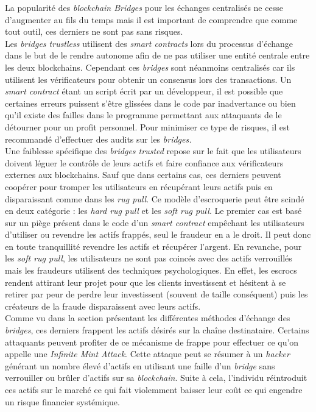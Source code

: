 La popularité des \textit{\gls{blockchain} Bridges} pour les échanges centralisés ne cesse d’augmenter au fils du temps mais il est important de comprendre que comme tout outil, ces derniers ne sont pas sans risques. \\

Les \textit{bridges trustless} utilisent des \textit{\gls{smart contract}s} lors du processus d’échange dans le but de le rendre autonome afin de ne pas utiliser une entité centrale entre les deux \gls{blockchain}s. Cependant ces \textit{bridges} sont néanmoins centralisés car ils utilisent les vérificateurs pour obtenir un consensus lors des transactions.
Un \textit{\gls{smart contract}} étant un script écrit par un développeur, il est possible que certaines erreurs puissent s’être glissées dans le code par inadvertance ou bien qu’il existe des failles dans le programme permettant aux attaquants de le détourner pour un profit personnel. 
Pour minimiser ce type de risques, il est recommandé d’effectuer des audits sur les \textit{bridges.} \\

Une faiblesse spécifique des \textit{bridges trusted} repose sur le fait que les utilisateurs doivent léguer le contrôle de leurs \gls{actif}s et faire confiance aux vérificateurs externes aux \gls{blockchain}s. Sauf que dans certains cas, ces derniers peuvent coopérer pour tromper les utilisateurs en récupérant leurs \gls{actif}s puis en disparaissant comme dans les \textit{rug pull}\cite{EthereumRisks}. Ce modèle d’escroquerie peut être scindé en deux catégorie : les \textit{hard rug pull} et les \textit{soft rug pull}\cite{Hacken}. Le premier cas est basé sur un piège présent dans le code d’un \textit{\gls{smart contract}} empêchant les utilisateurs d’utiliser ou revendre les \gls{actif}s frappés, seul le fraudeur en a le droit. Il peut donc en toute tranquillité revendre les \gls{actif}s et récupérer l’argent. En revanche, pour les \textit{soft rug pull}, les utilisateurs ne sont pas coincés avec des \gls{actif}s verrouillés mais les fraudeurs utilisent des techniques psychologiques. En effet, les escrocs rendent attirant leur projet pour que les clients investissent et hésitent à se retirer par peur de perdre leur investissent (souvent de taille conséquent) puis les créateurs de la fraude disparaissent avec leurs \gls{actif}s.\\

Comme vu dans la section présentant les différentes méthodes d’échange des \textit{bridges}, ces derniers frappent les \gls{actif}s désirés sur la chaîne destinataire. Certains attaquants peuvent profiter de ce mécanisme de frappe pour effectuer ce qu’on appelle une \textit{Infinite Mint Attack}.\cite{ChainLinkRisks} Cette attaque peut se résumer à un \textit{hacker} générant un nombre élevé d’\gls{actif}s en utilisant une faille d’un \textit{bridge} sans verrouiller ou brûler d’\gls{actif}s sur sa \textit{\gls{blockchain}}. Suite à cela, l’individu réintroduit ces \gls{actif}s sur le marché ce qui fait violemment baisser leur coût ce qui engendre un risque financier systémique.\\

